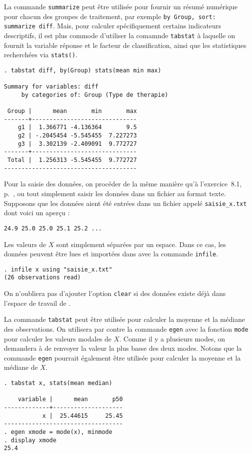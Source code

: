 La commande \texttt{summarize} peut être utilisée pour fournir un résumé
numérique pour chacun des groupes de traitement, par exemple 
\verb|by Group, sort: summarize diff|. Mais, pour calculer spécifiquement
certains indicateurs descriptifs, il est plus commode d'utiliser la comamnde
\texttt{tabstat} à laquelle on fournit la variable réponse et le facteur de
classification, ainsi que les statistiques recherchées via
\texttt{stats()}. \label{para:tabstat}
\begin{verbatim}
. tabstat diff, by(Group) stats(mean min max)

Summary for variables: diff
     by categories of: Group (Type de therapie)

 Group |      mean       min       max
-------+------------------------------
    g1 |  1.366771 -4.136364       9.5
    g2 | -.2045454 -5.545455  7.227273
    g3 |  3.302139 -2.409091  9.772727
-------+------------------------------
 Total |  1.256313 -5.545455  9.772727
--------------------------------------
\end{verbatim}
%
%
%
\soln{\ref{exo:8.4}} Pour la saisie des données, on procéder de la même
manière qu'à l'exercice~8.1, p.~\pageref{para:edit}, ou tout simplement
saisir les données dans un fichier au format texte. Supposons que les
données aient été entrées dans un fichier appelé \verb|saisie_x.txt| dont
voici un aperçu :
\begin{verbatim}
24.9 25.0 25.0 25.1 25.2 ...
\end{verbatim}
Les valeurs de $X$ sont simplement séparées par un espace. Dans ce cas, les
données peuvent être lues et importées dans \Stata avec la commande \texttt{infile}.
\begin{verbatim}
. infile x using "saisie_x.txt"             
(26 observations read)
\end{verbatim}
On n'oubliera pas d'ajouter l'option \texttt{clear} si des données existe
déjà dans l'espace de travail de \Stata.

La commande \texttt{tabstat} peut être utilisée pour calculer la moyenne et
la médiane des observations. On utilisera par contre la commande
\texttt{egen} avec la fonction \texttt{mode} pour calculer les valeurs
modales de $X$. Comme il y a plusieurs modes, on demandera à \Stata de
renvoyer la valeur la plus basse des deux modes. Notons que la commande
\texttt{egen} pourrait également être utilisée pour calculer la moyenne et
la médiane de $X$. 
\begin{verbatim}
. tabstat x, stats(mean median)

    variable |      mean       p50
-------------+--------------------
           x |  25.44615     25.45
----------------------------------
. egen xmode = mode(x), minmode
. display xmode
25.4
\end{verbatim}

